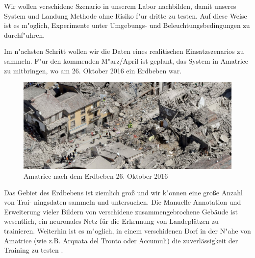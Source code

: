 \documentclass[a4paper]{article}
\begin{document}
Wir wollen verschidene Szenario in unserem Labor nachbilden, damit unseres System und Landung Methode ohne Risiko f"ur dritte zu testen. Auf diese Weise ist es m"oglich, Experimente unter Umgebungs- und Beleuchtungsbedingungen zu durchf"uhren. 

Im n"achsten Schritt wollen wir die Daten eines realitischen Einsatzszenarios zu sammeln.
F"ur den kommenden M"arz/April ist geplant, das System in Amatrice zu mitbringen, wo am 26. Oktober 2016 ein Erdbeben war.
\vspace{5mm}
\begin{figure}[h]
\includegraphics[width=1\textwidth]{Amatrice.jpg}
\captionsetup{labelformat=empty}
\caption{Amatrice nach dem Erdbeben 26. Oktober 2016}
\end{figure}
 
Das Gebiet des Erdbebens ist ziemlich groß und wir k"onnen eine große Anzahl von Trai-
ningsdaten sammeln und untersuchen. Die Manuelle Annotation und Erweiterung vieler Bildern von verschidene zusammengebrochene Gebäude ist wesentlich, ein neuronales Netz für die Erkennung von Landeplätzen zu trainieren. 
Weiterhin ist es m"oglich, in einem verschidenen Dorf in der N"ahe von Amatrice (wie z.B. Arquata del Tronto oder Accumuli) die zuverlässigkeit der Training zu testen .
\end{document}
